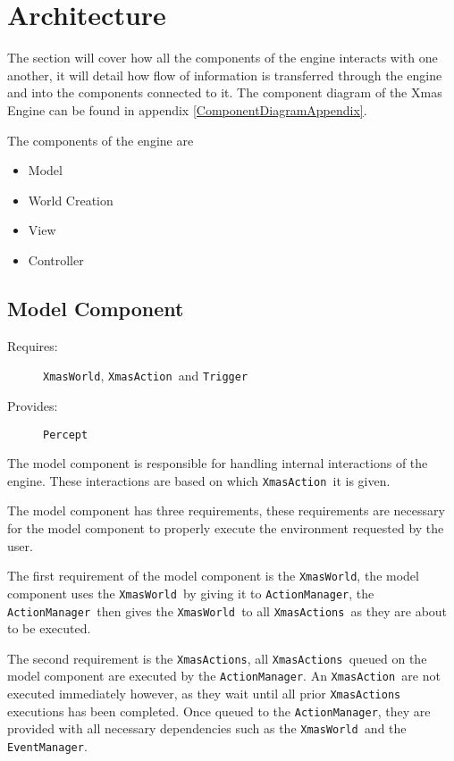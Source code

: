 
\section{Architecture}

The section will cover how all the components of the engine interacts
with one another, it will detail how flow of information is transferred
through the engine and into the components connected to it. The component
diagram of the Xmas Engine can be found in appendix \ref{ComponentDiagramAppendix}.

The components of the engine are
\begin{itemize}
\item Model
\item World Creation
\item View
\item Controller
\end{itemize}

\subsection{Model Component}
\begin{description}
\item [{Requires:}] \texttt{XmasWorld}, \texttt{XmasAction }and \texttt{Trigger }
\item [{Provides:}] \texttt{Percept}
\end{description}
The model component is responsible for handling internal interactions
of the engine. These interactions are based on which \texttt{XmasAction
}it is given. 

The model component has three requirements, these requirements are
necessary for the model component to properly execute the environment
requested by the user.

The first requirement of the model component is the \texttt{XmasWorld},
the model component uses the \texttt{XmasWorld }by giving it to \texttt{ActionManager},
the \texttt{ActionManager }then gives the \texttt{XmasWorld }to all
\texttt{XmasActions }as they are about to be executed. 

The second requirement is the \texttt{XmasActions}, all \texttt{XmasActions
}queued on the model component are executed by the \texttt{ActionManager}.
An \texttt{XmasAction }are not executed immediately however, as they
wait until all prior \texttt{XmasActions} executions has been completed.
Once queued to the \texttt{ActionManager}, they are provided with
all necessary dependencies such as the \texttt{XmasWorld }and the
\texttt{EventManager}.

